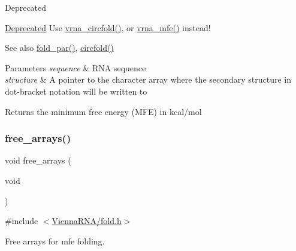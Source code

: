 \begin{DoxyRefDesc}{Deprecated}
\item[\hyperlink{deprecated__deprecated000068}{Deprecated}]Use \hyperlink{group__mfe__global_gaf973483d8acbc8cc9aacfc8a9b7f0074}{vrna\+\_\+circfold()}, or \hyperlink{group__mfe__global_gabd3b147371ccf25c577f88bbbaf159fd}{vrna\+\_\+mfe()} instead!\end{DoxyRefDesc}


\begin{DoxySeeAlso}{See also}
\hyperlink{group__mfe__global__deprecated_ga2bc41df5d71fee6fd8da9904ee65d8fb}{fold\+\_\+par()}, \hyperlink{group__mfe__global__deprecated_ga4ac63ab3e8d9a80ced28b8052d94e423}{circfold()}
\end{DoxySeeAlso}

\begin{DoxyParams}{Parameters}
{\em sequence} & R\+NA sequence \\
\hline
{\em structure} & A pointer to the character array where the secondary structure in dot-\/bracket notation will be written to \\
\hline
\end{DoxyParams}
\begin{DoxyReturn}{Returns}
the minimum free energy (M\+FE) in kcal/mol 
\end{DoxyReturn}
\mbox{\label{group__mfe__global__deprecated_ga107fdfe5fd641868156bfd849f6866c7}} 
\subsubsection{\texorpdfstring{free\+\_\+arrays()}{free\_arrays()}}
{\footnotesize\ttfamily void free\+\_\+arrays (\begin{DoxyParamCaption}\item[{void}]{ }\end{DoxyParamCaption})}



{\ttfamily \#include $<$\hyperlink{fold_8h}{Vienna\+R\+N\+A/fold.\+h}$>$}



Free arrays for mfe folding. 

